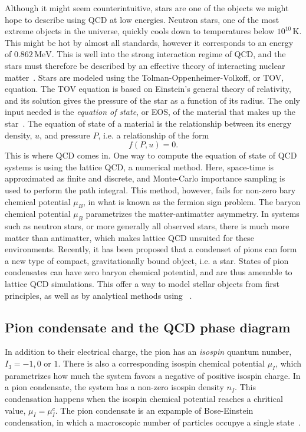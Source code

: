 Although it might seem counterintuitive, stars are one of the objects we might hope to describe using QCD at low energies.
Neutron stars, one of the most extreme objects in the universe, quickly cools down to temperatures below $10^{10} \, \text{K}$.
This might be hot by almost all standards, however it corresponds to an energy of $0.862 \, \text{MeV}$.
This is well into the strong interaction regime of QCD, and the stars must therefore be described by an effective theory of interacting nuclear matter~\cite{glendenning:compcat_stars,from_hadrons_to_quarks}.
Stars are modeled using the Tolman-Oppenheimer-Volkoff, or TOV, equation.
The TOV equation is based on Einstein's general theory of relativity, and its solution gives the pressure of the star as a function of its radius.
The only input needed is the \emph{equation of state}, or EOS, of the material that makes up the star~\cite{Carroll:spacetime}.
The equation of state of a material is the relationship between its energy density, $u$, and pressure $P$, i.e. a relationship of the form
\begin{equation}
    f(P, u) = 0.
\end{equation}
This is where QCD comes in.
One way to compute the equation of state of QCD systems is using the lattice QCD, a numerical method.
Here, space-time is approximated as finite and discrete, and Monte-Carlo importance sampling is used to perform the path integral.
This method, however, fails for non-zero bary chemical potential $\mu_B$, in what is known as the fermion sign problem.
The baryon chemical potential $\mu_B$ parametrizes the matter-antimatter asymmetry.
In systems such as neutron stars, or more generally all observed stars, there is much more matter than antimatter, which makes lattice QCD unsuited for these environments.
Recently, it has been proposed that a condenset of pions can form a new type of compact, gravitationally bound object, i.e. a star.
States of pion condensates can have zero baryon chemical potential, and are thus amenable to lattice QCD simulations.
This offer a way to model stellar objects from first principles, as well as by analytical methods using \chpt~\cite{new_clas_of_compact_stars,andersen:bose_einstein}.

\subsection*{Pion condensate and the QCD phase diagram}

In addition to their electrical charge, the pion has an \emph{isospin} quantum number, $I_3 = -1, 0$ or $1$.
There is also a corresponding isospin chemical potential $\mu_I$, which parametrizes how much the system favors a negative of positive isospin charge.
In a pion condensate, the system has a non-zero isospin density $n_I$.
This condensation happens when the isospin chemical potential reaches a chritical value, $\mu_I = \mu_I^c$.
The pion condensate is an expample of Bose-Einstein condensation, in which a macroscopic number of particles occupye a single state~\cite{Brandt:QCD_phase_diagram_with_isospin_chemical_potential,Brandt:QCD_phase_diagram_for_nonzero_isospin-asymmetry}.

